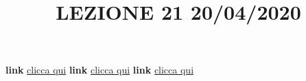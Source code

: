 \newline
\newline
\title{LEZIONE 21 20/04/2020}\newline
\textbf{link} \href{https://web.microsoftstream.com/video/f5da554d-83ce-4ed3-8e0c-2b34dbbeb953?list=user&userId=faa91214-a6f5-40d7-8875-253fd49b8ce1}{clicca qui}\newline
\textbf{link} \href{https://web.microsoftstream.com/video/423d1c7d-ba68-4b30-8b43-5a956d01f3b3?list=user&userId=faa91214-a6f5-40d7-8875-253fd49b8ce1}{clicca qui}\newline
\textbf{link} \href{https://web.microsoftstream.com/video/3ff11729-f50d-40c1-9bb0-f66ecba9fd1d?list=user&userId=faa91214-a6f5-40d7-8875-253fd49b8ce1}{clicca qui}